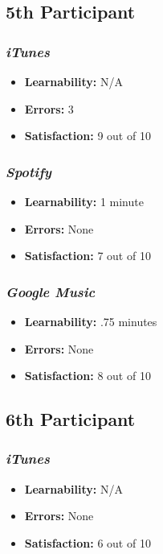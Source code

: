 \documentclass{article}
\begin{document}
\begin{multicols}{2}
\subsection{5th Participant}

\subsubsection{\it iTunes}
\begin{itemize}
	\item {\bf Learnability:} N/A
	\item {\bf Errors:}  3
	\item {\bf Satisfaction:} 9 out of 10 
\end{itemize}

\subsubsection{\it Spotify}
\begin{itemize}
	\item {\bf Learnability:} 1 minute
	\item {\bf Errors:} None
	\item {\bf Satisfaction:} 7 out of 10 
\end{itemize}

\subsubsection{\it Google Music}
\begin{itemize}
\item {\bf Learnability:} .75 minutes
	\item {\bf Errors:} None
	\item {\bf Satisfaction:} 8 out of 10 
\end{itemize}

\subsection{6th Participant}

\subsubsection{\it iTunes}
\begin{itemize}
	\item {\bf Learnability:} N/A
	\item {\bf Errors:}  None
	\item {\bf Satisfaction:} 6 out of 10 
\end{itemize}


\end{multicols}
\end{document}
